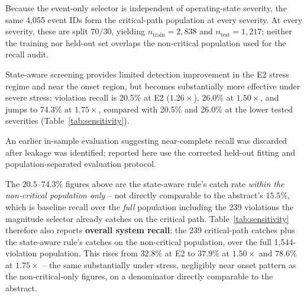 \documentclass[11pt,conference]{IEEEtran}
\begin{document}
Because the event-only selector is independent of operating-state severity, the same 4,055 event IDs
form the critical-path population at every severity. At every severity, these are split 70/30,
yielding $n_{\mathrm{train}}=2{,}838$ and $n_{\mathrm{test}}=1{,}217$; neither the training nor
held-out set overlaps the non-critical population used for the recall audit.

State-aware screening provides limited detection improvement in the E2 stress regime and near the
onset region, but becomes substantially more effective under severe stress: violation recall is
20.5\% at E2 ($1.26\times$), 26.0\% at $1.50\times$, and jumps to 74.3\% at $1.75\times$, compared
with 20.5\% and 26.0\% at the lower tested severities (Table~\ref{tab:sensitivity}).

An earlier in-sample evaluation suggesting near-complete recall was discarded after leakage was
identified; %
reported here use the corrected held-out fitting and population-separated evaluation protocol.

The $20.5$--$74.3\%$ figures above are the state-aware rule's catch rate \textit{within the
non-critical population only} -- not directly comparable to the abstract's $15.5\%$, which is
baseline recall over the \textit{full} population including the 239 violations the magnitude
selector already catches on the critical path. Table~\ref{tab:sensitivity} therefore also reports
\textbf{overall system recall}: the 239 critical-path catches plus the state-aware rule's
catches on the non-critical population, over the full 1,544-violation population. This rises from
$32.8\%$ at E2 to $37.9\%$ at $1.50\times$ and $78.6\%$ at $1.75\times$ -- the same substantially
under stress, negligibly near onset pattern as the non-critical-only figures, on a denominator
directly comparable to the abstract.
\end{document}
